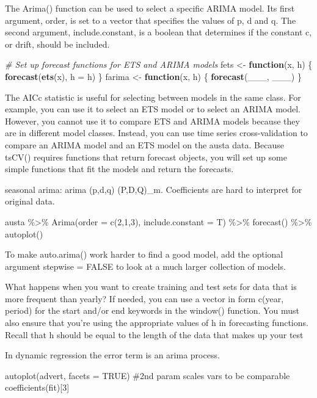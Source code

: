 \documentclass[]{book}
\newenvironment{Shaded}{\begin{snugshade}}{\end{snugshade}}
\newcommand{\KeywordTok}[1]{\textcolor[rgb]{0.13,0.29,0.53}{\textbf{#1}}}
\newcommand{\DataTypeTok}[1]{\textcolor[rgb]{0.13,0.29,0.53}{#1}}
\newcommand{\StringTok}[1]{\textcolor[rgb]{0.31,0.60,0.02}{#1}}
\newcommand{\CommentTok}[1]{\textcolor[rgb]{0.56,0.35,0.01}{\textit{#1}}}
\newcommand{\ControlFlowTok}[1]{\textcolor[rgb]{0.13,0.29,0.53}{\textbf{#1}}}
\newcommand{\NormalTok}[1]{#1}
\begin{document}
The Arima() function can be used to select a specific ARIMA model. Its
first argument, order, is set to a vector that specifies the values of
p, d and q. The second argument, include.constant, is a boolean that
determines if the constant c, or drift, should be included.

\begin{Shaded}
\begin{Highlighting}[]
\CommentTok{# Set up forecast functions for ETS and ARIMA models}
\NormalTok{fets <-}\StringTok{ }\ControlFlowTok{function}\NormalTok{(x, h) \{}
  \KeywordTok{forecast}\NormalTok{(}\KeywordTok{ets}\NormalTok{(x), }\DataTypeTok{h =}\NormalTok{ h)}
\NormalTok{\}}
\NormalTok{farima <-}\StringTok{ }\ControlFlowTok{function}\NormalTok{(x, h) \{}
  \KeywordTok{forecast}\NormalTok{(___, ___)}
\NormalTok{\}}
\end{Highlighting}
\end{Shaded}

The AICc statistic is useful for selecting between models in the same
class. For example, you can use it to select an ETS model or to select
an ARIMA model. However, you cannot use it to compare ETS and ARIMA
models because they are in different model classes. Instead, you can use
time series cross-validation to compare an ARIMA model and an ETS model
on the austa data. Because tsCV() requires functions that return
forecast objects, you will set up some simple functions that fit the
models and return the forecasts.

seasonal arima: arima (p,d,q) (P,D,Q)\_m. Coefficients are hard to
interpret for original data.

austa \%\textgreater{}\% Arima(order = c(2,1,3), include.constant = T)
\%\textgreater{}\% forecast() \%\textgreater{}\% autoplot()

To make auto.arima() work harder to find a good model, add the optional
argument stepwise = FALSE to look at a much larger collection of models.

What happens when you want to create training and test sets for data
that is more frequent than yearly? If needed, you can use a vector in
form c(year, period) for the start and/or end keywords in the window()
function. You must also ensure that you're using the appropriate values
of h in forecasting functions. Recall that h should be equal to the
length of the data that makes up your test

In dynamic regression the error term is an arima process.

autoplot(advert, facets = TRUE) \#2nd param scales vars to be comparable
coefficients(fit){[}3{]}
\end{document}
